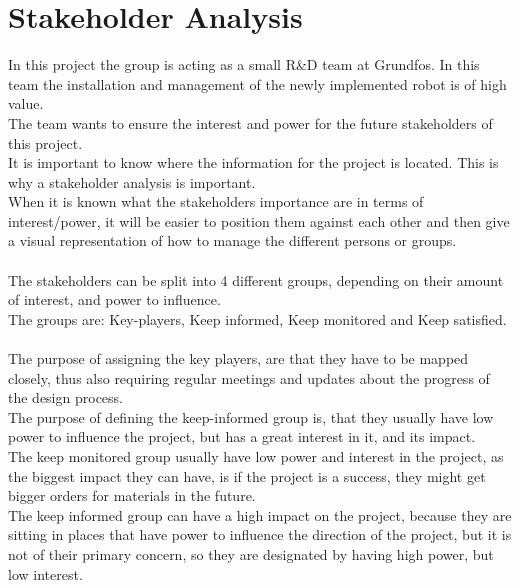 \chapter{Stakeholder Analysis} \label{ch:Stakeholder Analysis}

In this project the group is acting as a small R\&D team at Grundfos. In this team the installation and management of the newly implemented robot is of high value.\\
The team wants to ensure the interest and power for the future stakeholders of this project.\\
It is important to know where the information for the project is located. This is why a stakeholder analysis is important.\\
When it is known what the stakeholders importance are in terms of interest/power, it will be easier to position them against each other and then give a visual representation of how to manage the different persons or groups.\\
\\
The stakeholders can be split into 4 different groups, depending on their amount of interest, and power to influence.\\
The groups are: Key-players, Keep informed, Keep monitored and Keep satisfied.\\
\\
The purpose of assigning the key players, are that they have to be mapped closely, thus also requiring regular meetings and updates about the progress of the design process.\\
The purpose of defining the keep-informed group is, that they usually have low power to influence the project, but has a great interest in it, and its impact.\\
The keep monitored group usually have low power and interest in the project, as the biggest impact they can have, is if the project is a success, they might get bigger orders for materials in the future.\\
The keep informed group can have a high impact on the project, because they are sitting in places that have power to influence the direction of the project, but it is not of their primary concern, so they are designated by having high power, but low interest.\\




